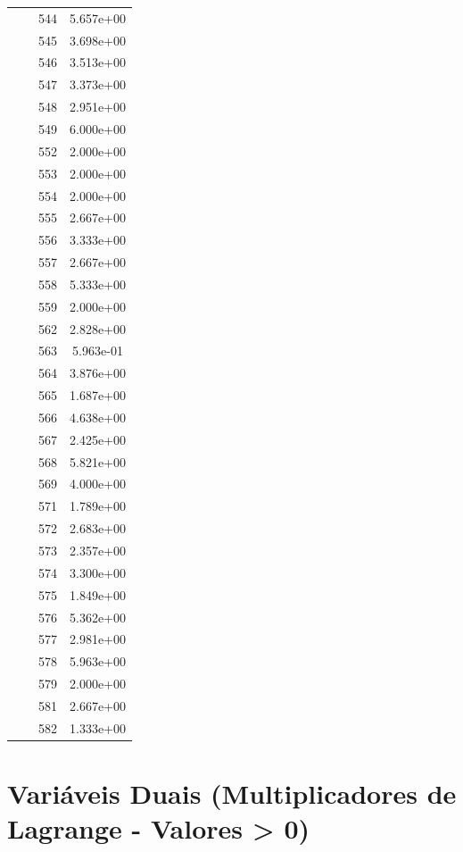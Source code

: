 \documentclass[12pt]{article}
\begin{document}
\begin{longtable}{@{}cccc@{}}
 &  & 544 & 5.657e+00 \\
 &  & 545 & 3.698e+00 \\
 &  & 546 & 3.513e+00 \\
 &  & 547 & 3.373e+00 \\
 &  & 548 & 2.951e+00 \\
 &  & 549 & 6.000e+00 \\
 &  & 552 & 2.000e+00 \\
 &  & 553 & 2.000e+00 \\
 &  & 554 & 2.000e+00 \\
 &  & 555 & 2.667e+00 \\
 &  & 556 & 3.333e+00 \\
 &  & 557 & 2.667e+00 \\
 &  & 558 & 5.333e+00 \\
 &  & 559 & 2.000e+00 \\
 &  & 562 & 2.828e+00 \\
 &  & 563 & 5.963e-01 \\
 &  & 564 & 3.876e+00 \\
 &  & 565 & 1.687e+00 \\
 &  & 566 & 4.638e+00 \\
 &  & 567 & 2.425e+00 \\
 &  & 568 & 5.821e+00 \\
 &  & 569 & 4.000e+00 \\
 &  & 571 & 1.789e+00 \\
 &  & 572 & 2.683e+00 \\
 &  & 573 & 2.357e+00 \\
 &  & 574 & 3.300e+00 \\
 &  & 575 & 1.849e+00 \\
 &  & 576 & 5.362e+00 \\
 &  & 577 & 2.981e+00 \\
 &  & 578 & 5.963e+00 \\
 &  & 579 & 2.000e+00 \\
 &  & 581 & 2.667e+00 \\
 &  & 582 & 1.333e+00 \\

\bottomrule
\end{longtable}


\section{Variáveis Duais (Multiplicadores de Lagrange - Valores > 0)}
\end{document}
